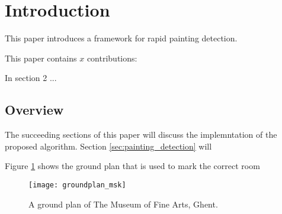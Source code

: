 \section{Introduction}
	
	This paper introduces a framework for rapid painting detection.
	
	
	
	
	
	
	This paper contains $x$ contributions:
	
	
	In section 2 ...
	
	\subsection{Overview}
	The succeeding sections of this paper will discuss the implemntation of the proposed algorithm. Section \ref{sec:painting_detection} will 
	
	Figure \ref{fig:groundplan_msk} shows the ground plan that is used to mark the correct room
	
	\begin{figure}
		\texttt{[image: groundplan\_msk]}
		\caption{A ground plan of The Museum of Fine Arts, Ghent. }
		\label{fig:groundplan_msk}
	\end{figure}